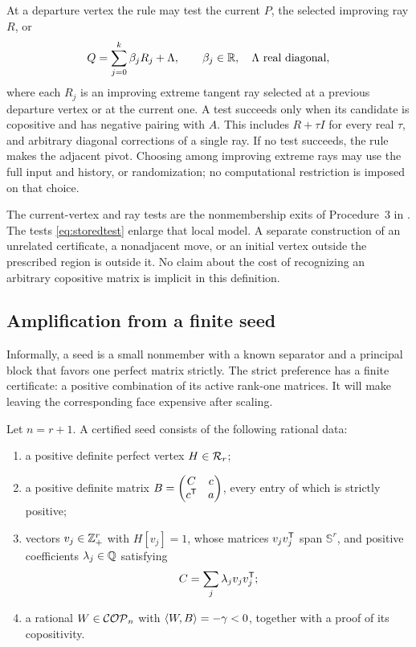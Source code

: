 At a departure vertex the rule may test the current $P$, the selected improving ray $R$, or
\begin{equation}\label{eq:storedtest}
 Q=\sum_{j=0}^k\beta_jR_j+\Lambda,
 \qquad \beta_j\in\mathbb R,\quad\Lambda\text{ real diagonal},
\end{equation}
where each $R_j$ is an improving extreme tangent ray selected at a previous departure vertex or at the current one. A test succeeds only when its candidate is copositive and has negative pairing with $A$. This includes $R+\tau I$ for every real $\tau$, and arbitrary diagonal corrections of a single ray. If no test succeeds, the rule makes the adjacent pivot. Choosing among improving extreme rays may use the full input and history, or randomization; no computational restriction is imposed on that choice.

The current-vertex and ray tests are the nonmembership exits of Procedure~3 in \cite{DSV}. The tests \eqref{eq:storedtest} enlarge that local model. A separate construction of an unrelated certificate, a nonadjacent move, or an initial vertex outside the prescribed region is outside it. No claim about the cost of recognizing an arbitrary copositive matrix is implicit in this definition.

\subsection{Amplification from a finite seed}
Informally, a seed is a small nonmember with a known separator and a principal block that favors one perfect matrix strictly. The strict preference has a finite certificate: a positive combination of its active rank-one matrices. It will make leaving the corresponding face expensive after scaling.

\begin{definition}\label{def:seed}
Let $n=r+1$. A certified seed consists of the following rational data:
\begin{enumerate}[label=(\roman*),itemsep=2pt]
\item a positive definite perfect vertex $H\in\mathcal R_r$;
\item a positive definite matrix $B=\begin{pmatrix}C&c\\c^{\mathsf T}&a\end{pmatrix}$, every entry of which is strictly positive;
\item vectors $v_j\in\mathbb Z_+^r$ with $H[v_j]=1$, whose matrices $v_jv_j^{\mathsf T}$ span $\mathbb S^r$, and positive coefficients $\lambda_j\in\mathbb Q$ satisfying
\begin{equation}\label{eq:reserve}
 C=\sum_j\lambda_jv_jv_j^{\mathsf T};
\end{equation}
\item a rational $W\in\mathcal{COP}_n$ with $\langle W,B\rangle=-\gamma<0$, together with a proof of its copositivity.
\end{enumerate}
\end{definition}

